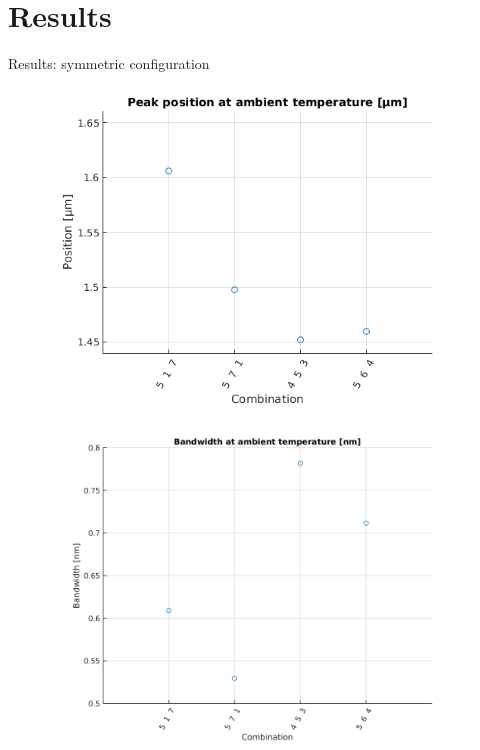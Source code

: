 \documentclass[11pt, leqno]{beamer}
\begin{document}
\section{Results}
\begin{frame}{Results: symmetric configuration}
	\begin{figure}
		\centering
		\includegraphics[height=.8\textheight]{ppaat22.png}
	\end{figure}
\end{frame}
\begin{frame}
	\begin{figure}
		\centering
		\includegraphics[height=.9\textheight]{baat2.png}
	\end{figure}
\end{frame}
\end{document}
